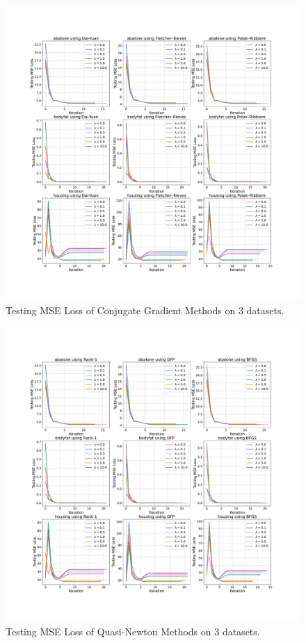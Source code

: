 \begin{figure}[!htbp]
    \centering
    \includegraphics[scale = 0.28]{fig/ConjGrad.pdf}
    \caption{Testing MSE Loss of Conjugate Gradient Methods on \(3\) datasets.}
    \label{fig:conjgrad}
\end{figure}

\begin{figure}[!htbp]
    \centering
    \includegraphics[scale = 0.28]{fig/QN.pdf}
    \caption{Testing MSE Loss of Quasi-Newton Methods on \(3\) datasets.}
    \label{fig:qn}
\end{figure}